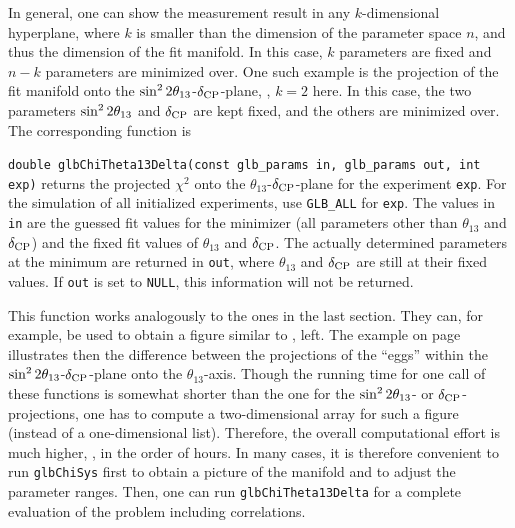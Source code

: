 In general, one can show the measurement result in any $k$-dimensional hyperplane, where $k$ is smaller than the dimension of the parameter space $n$, and thus the dimension of the fit manifold. In this case, $k$ parameters are fixed and $n-k$ parameters are minimized over. One such example is the projection of the fit manifold onto the $\sin^2 2 \theta_{13}$-$\delta_{\mathrm{CP}}$-plane, \ie, $k=2$ here. In this case, the two
parameters $\sin^2 2 \theta_{13}$ and $\delta_{\mathrm{CP}}$ are kept fixed, and the others are
minimized over. 
The corresponding function is 
\begin{function}
{\tt double glbChiTheta13Delta(const glb\_params in, glb\_params out, int exp)} returns the projected $\chi^2$ onto the $\theta_{13}$-$\delta_{\mathrm{CP}}$-plane for the  experiment {\tt exp}. For the simulation of all initialized experiments,
use {\tt GLB\_ALL} for {\tt exp}. The values in {\tt in} are the guessed fit values for the minimizer (all parameters other than $\theta_{13}$ and $\delta_{\mathrm{CP}}$) and the fixed fit values of $\theta_{13}$ and $\delta_{\mathrm{CP}}$. The actually determined parameters at the minimum are returned in {\tt out}, where $\theta_{13}$ and $\delta_{\mathrm{CP}}$ are still at their fixed values. If {\tt out} is set to {\tt NULL}, this information will not be returned.
\end{function}
This function works analogously to the ones in the last section. They can, for example, be used to obtain a figure similar to , left.
The example on page~\pageref{ex:corrproj} illustrates then the difference
between the projections of the ``eggs'' within the 
$\sin^2 2 \theta_{13}$-$\delta_{\mathrm{CP}}$-plane onto the $\theta_{13}$-axis. 
Though the running time for one call of these functions is somewhat 
shorter than the one for the $\sin^2 2 \theta_{13}$- or $\delta_{\mathrm{CP}}$-projections, one 
has to compute a two-dimensional array for such a figure (instead of a 
one-dimensional list). Therefore, the overall computational effort is 
much higher, \ie, in the order of hours. In many cases, it is therefore
convenient to run {\tt glbChiSys} first to obtain a picture of
the manifold and to adjust the parameter ranges. Then, one can run
{\tt glbChiTheta13Delta} for a complete evaluation of the problem
including correlations.


